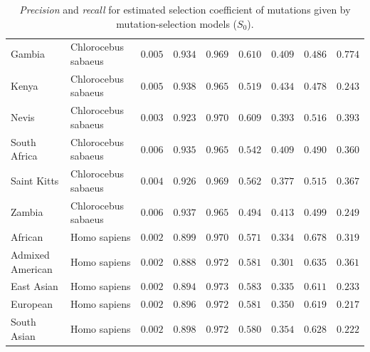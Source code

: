 \documentclass{article}
\newcommand{\Sphy}{S_{0}}
\begin{document}
\begin{table}[tb]
\begin{adjustbox}{width=\textwidth}
\begin{tabular}{||l|l|r||r|r||r|r||r|r||}
                \rowcolor{LIGHTGREY} Gambia             & Chlorocebus sabaeus & $ 0.005$ & $ 0.934$ & $ 0.969$ & $ 0.610$ & $ 0.409$ & $ 0.486$ & $ 0.774$ \\
                \rowcolor{LIGHTGREY} Kenya                                 & Chlorocebus sabaeus        & $ 0.005$ & $ 0.938$ & $ 0.965$ & $ 0.519$ & $ 0.434$ & $ 0.478$ & $ 0.243$ \\
                \rowcolor{LIGHTGREY} Nevis                        & Chlorocebus sabaeus        & $ 0.003$ & $ 0.923$ & $ 0.970$ & $ 0.609$ & $ 0.393$ & $ 0.516$ & $ 0.393$ \\
                \rowcolor{LIGHTGREY} South Africa                              & Chlorocebus sabaeus        & $ 0.006$ & $ 0.935$ & $ 0.965$ & $ 0.542$ & $ 0.409$ & $ 0.490$ & $ 0.360$ \\
                \rowcolor{LIGHTGREY} Saint Kitts                                & Chlorocebus sabaeus        & $ 0.004$ & $ 0.926$ & $ 0.969$ & $ 0.562$ & $ 0.377$ & $ 0.515$ & $ 0.367$ \\
                \rowcolor{LIGHTGREY} Zambia                             & Chlorocebus sabaeus        & $ 0.006$ & $ 0.937$ & $ 0.965$ & $ 0.494$ & $ 0.413$ & $ 0.499$ & $ 0.249$ \\
                African                             & Homo sapiens        & $ 0.002$ & $ 0.899$ & $ 0.970$ & $ 0.571$ & $ 0.334$ & $ 0.678$ & $ 0.319$ \\
                Admixed American                             & Homo sapiens        & $ 0.002$ & $ 0.888$ & $ 0.972$ & $ 0.581$ & $ 0.301$ & $ 0.635$ & $ 0.361$ \\
                East Asian                             & Homo sapiens        & $ 0.002$ & $ 0.894$ & $ 0.973$ & $ 0.583$ & $ 0.335$ & $ 0.611$ & $ 0.233$ \\
                European                             & Homo sapiens        & $ 0.002$ & $ 0.896$ & $ 0.972$ & $ 0.581$ & $ 0.350$ & $ 0.619$ & $ 0.217$ \\
                South Asian                             & Homo sapiens        & $ 0.002$ & $ 0.898$ & $ 0.972$ & $ 0.580$ & $ 0.354$ & $ 0.628$ & $ 0.222$ \\
                \bottomrule
            \end{tabular}
        \end{adjustbox}
        \caption{
            \textit{Precision} and \textit{recall} for estimated selection coefficient of mutations given by mutation-selection models ($\Sphy$).
}
\end{table}
\end{document}
